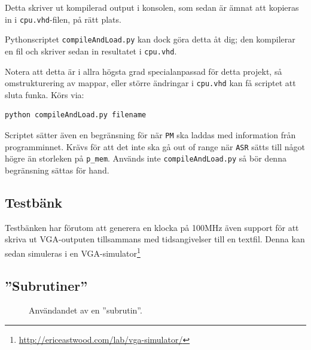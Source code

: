\documentclass[]{article}
\begin{document}
\noindent
Detta skriver ut kompilerad output i konsolen, som sedan är ämnat att kopieras in i \texttt{cpu.vhd}-filen, på rätt plats. 

Pythonscriptet \texttt{compileAndLoad.py} kan dock göra detta åt dig; den kompilerar en fil och skriver sedan in resultatet i \texttt{cpu.vhd}. 

Notera att detta är i allra högsta grad specialanpassad för detta projekt, så omstrukturering av mappar, eller större ändringar i \texttt{cpu.vhd} kan få scriptet att sluta funka. Körs via:\\

\begin{Verbatim}[frame=single]
python compileAndLoad.py filename
\end{Verbatim}

\noindent
Scriptet sätter även en begränsning för när \texttt{PM} ska laddas med information från programminnet. Krävs för att det inte ska gå out of range när \texttt{ASR} sätts till något högre än storleken på \texttt{p\_mem}. Används inte \texttt{compileAndLoad.py} så bör denna begränsning sättas för hand.

\subsection{Testbänk}
Testbänken har förutom att generera en klocka på 100MHz även support för att skriva ut VGA-outputen tillsammans med tidsangivelser till en textfil. Denna kan sedan simuleras i en VGA-simulator\footnote{\href{http://ericeastwood.com/lab/vga-simulator/}{\url{http://ericeastwood.com/lab/vga-simulator/}}}

\subsection{''Subrutiner''}
\begin{figure}[h!]
	\caption{Användandet av en ''subrutin''. }
\end{figure}
\end{document}
